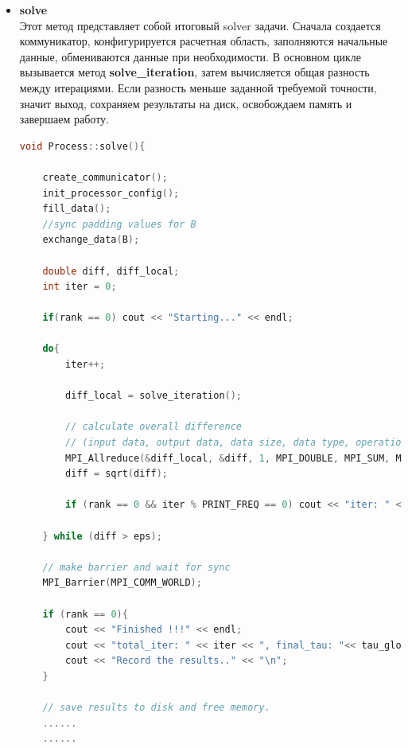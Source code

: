 \documentclass{article}
\begin{document}
\begin{itemize}
\begin{lstlisting}[language=C, caption=Process::solve\_iteration()]
    // store current w
    for (int i = 1; i <= size_x; i++)
        for (int j = 1; j <= size_y; j++)
            w_pr[i * (size_y + 2) + j] = w[i * (size_y + 2) + j];

    // the sum of squared elements
    return diff_local * diff_local;
}
    \end{lstlisting}
    \item \textbf{solve}\\
    Этот метод представляет собой итоговый solver задачи. Сначала создается коммуникатор, конфигурируется расчетная область, заполняются начальные данные, обмениваются данные при необходимости. В основном цикле вызывается метод \textbf{solve\_iteration}, затем вычисляется общая разность между итерациями. Если разность меньше заданной требуемой точности, значит выход, сохраняем результаты на диск, освобождаем память и завершаем работу.
    \begin{lstlisting}[language=C, caption=Process::solve()]
void Process::solve(){

    create_communicator();
    init_processor_config();
    fill_data();
    //sync padding values for B
    exchange_data(B);

    double diff, diff_local;
    int iter = 0;

    if(rank == 0) cout << "Starting..." << endl;

    do{
        iter++;

        diff_local = solve_iteration();

        // calculate overall difference 
        // (input data, output data, data size, data type, operation type, communicator)
        MPI_Allreduce(&diff_local, &diff, 1, MPI_DOUBLE, MPI_SUM, MPI_COMM_WORLD);
        diff = sqrt(diff);
        
        if (rank == 0 && iter % PRINT_FREQ == 0) cout << "iter: " << iter << ", tau: " << tau_global << ", err_norm: " << diff << "\n";

    } while (diff > eps);

    // make barrier and wait for sync
    MPI_Barrier(MPI_COMM_WORLD);

    if (rank == 0){
        cout << "Finished !!!" << endl;
        cout << "total_iter: " << iter << ", final_tau: "<< tau_global <<", final_err_norm: " << diff << "\n";
        cout << "Record the results.." << "\n";
    }

    // save results to disk and free memory.
    ......
    ......
    \end{lstlisting}
    
\end{itemize}
\end{document}
